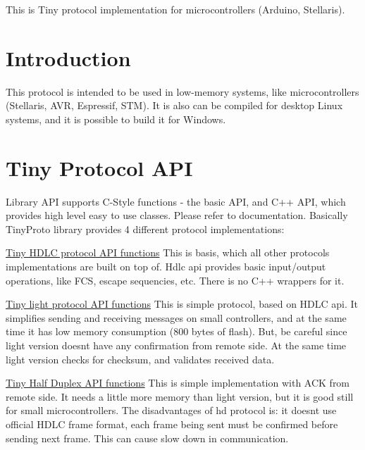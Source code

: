 This is Tiny protocol implementation for microcontrollers (Arduino, Stellaris).\hypertarget{index_introduction}{}\section{Introduction}\label{index_introduction}
This protocol is intended to be used in low-\/memory systems, like microcontrollers (Stellaris, A\+VR, Espressif, S\+TM). It is also can be compiled for desktop Linux systems, and it is possible to build it for Windows.\hypertarget{index_api}{}\section{Tiny Protocol A\+PI}\label{index_api}
Library A\+PI supports C-\/\+Style functions -\/ the basic A\+PI, and C++ A\+PI, which provides high level easy to use classes. Please refer to documentation. Basically Tiny\+Proto library provides 4 different protocol implementations\+:

\hyperlink{group__HDLC__API}{Tiny H\+D\+LC protocol A\+PI functions} This is basis, which all other protocols implementations are built on top of. Hdlc api provides basic input/output operations, like F\+CS, escape sequencies, etc. There is no C++ wrappers for it.

\hyperlink{group__LIGHT__API}{Tiny light protocol A\+PI functions} This is simple protocol, based on H\+D\+LC api. It simplifies sending and receiving messages on small controllers, and at the same time it has low memory consumption (800 bytes of flash). But, be careful since light version doesn\textquotesingle{}t have any confirmation from remote side. At the same time light version checks for checksum, and validates received data.

\hyperlink{group__HALF__DUPLEX__API}{Tiny Half Duplex A\+PI functions} This is simple implementation with A\+CK from remote side. It needs a little more memory than light version, but it is good still for small microcontrollers. The disadvantages of hd protocol is\+: it doesn\textquotesingle{}t use official H\+D\+LC frame format, each frame being sent must be confirmed before sending next frame. This can cause slow down in communication.

